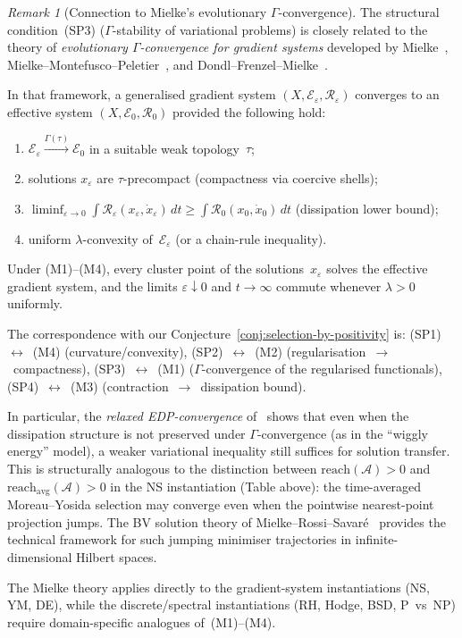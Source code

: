 \documentclass[12pt,a4paper]{article}
\theoremstyle{definition}
\theoremstyle{remark}
\newtheorem{remark}[theorem]{Remark}
\begin{document}
\begin{remark}[Connection to Mielke's evolutionary $\Gamma$-convergence]
\label{rem:mielke-edp}
The structural condition~\textup{(SP3)} ($\Gamma$-stability of variational problems) is closely related to the theory of \emph{evolutionary $\Gamma$-convergence for gradient systems} developed by Mielke~\cite{Mielke2016}, Mielke--Montefusco--Peletier~\cite{MielkeMontefuscoPeletier2021}, and Dondl--Frenzel--Mielke~\cite{DondlFrenzelMielke2019}.

In that framework, a generalised gradient system $(X, \mathcal{E}_\varepsilon, \mathcal{R}_\varepsilon)$ converges to an effective system $(X, \mathcal{E}_0, \mathcal{R}_0)$ provided the following hold:
\begin{enumerate}
\item[(M1)] $\mathcal{E}_\varepsilon \xrightarrow{\Gamma(\tau)} \mathcal{E}_0$ in a suitable weak topology~$\tau$;
\item[(M2)] solutions $x_\varepsilon$ are $\tau$-precompact (compactness via coercive shells);
\item[(M3)] $\liminf_{\varepsilon \to 0} \int \mathcal{R}_\varepsilon(x_\varepsilon, \dot{x}_\varepsilon)\,dt \geq \int \mathcal{R}_0(x_0, \dot{x}_0)\,dt$ (dissipation lower bound);
\item[(M4)] uniform $\lambda$-convexity of~$\mathcal{E}_\varepsilon$ (or a chain-rule inequality).
\end{enumerate}
Under (M1)--(M4), every cluster point of the solutions~$x_\varepsilon$ solves the effective gradient system, and the limits $\varepsilon \downarrow 0$ and $t \to \infty$ commute whenever $\lambda > 0$ uniformly.

The correspondence with our Conjecture~\ref{conj:selection-by-positivity} is:
\textup{(SP1)}~$\leftrightarrow$~\textup{(M4)} (curvature/convexity), \textup{(SP2)}~$\leftrightarrow$~\textup{(M2)} (regularisation~$\to$~compactness), \textup{(SP3)}~$\leftrightarrow$~\textup{(M1)} ($\Gamma$-convergence of the regularised functionals), \textup{(SP4)}~$\leftrightarrow$~\textup{(M3)} (contraction~$\to$~dissipation bound).

In particular, the \emph{relaxed EDP-convergence} of~\cite{DondlFrenzelMielke2019} shows that even when the dissipation structure is not preserved under $\Gamma$-convergence (as in the ``wiggly energy'' model), a weaker variational inequality still suffices for solution transfer. This is structurally analogous to the distinction between $\mathrm{reach}(\mathcal{A}) > 0$ and $\mathrm{reach}_{\mathrm{avg}}(\mathcal{A}) > 0$ in the NS instantiation (Table above): the time-averaged Moreau--Yosida selection may converge even when the pointwise nearest-point projection jumps. The BV solution theory of Mielke--Rossi--Savar\'e~\cite{MielkeRossiSavare2016} provides the technical framework for such jumping minimiser trajectories in infinite-dimensional Hilbert spaces.

The Mielke theory applies directly to the gradient-system instantiations (NS, YM, DE), while the discrete/spectral instantiations (RH, Hodge, BSD, P~vs~NP) require domain-specific analogues of~\textup{(M1)--(M4)}.
\end{remark}
\end{document}
